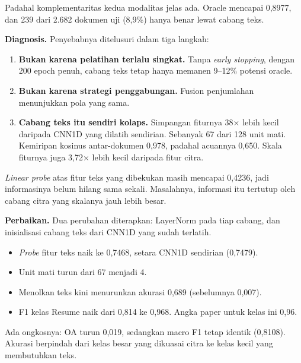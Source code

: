 \documentclass[11pt,a4paper]{article}
\begin{document}
Padahal komplementaritas kedua modalitas jelas ada. Oracle mencapai 0,8977, dan 239
dari 2.682 dokumen uji (8,9\%) hanya benar lewat cabang teks.

\textbf{Diagnosis.} Penyebabnya ditelusuri dalam tiga langkah:
\begin{enumerate}
  \item \textbf{Bukan karena pelatihan terlalu singkat.} Tanpa \textit{early stopping},
  dengan 200 epoch penuh, cabang teks tetap hanya memanen 9--12\% potensi oracle.
  \item \textbf{Bukan karena strategi penggabungan.} Fusion penjumlahan menunjukkan
  pola yang sama.
  \item \textbf{Cabang teks itu sendiri kolaps.} Simpangan fiturnya 38$\times$ lebih kecil
  daripada CNN1D yang dilatih sendirian. Sebanyak 67 dari 128 unit mati. Kemiripan
  kosinus antar-dokumen 0,978, padahal acuannya 0,650. Skala fiturnya juga
  3,72$\times$ lebih kecil daripada fitur citra.
\end{enumerate}
\textit{Linear probe} atas fitur teks yang dibekukan masih mencapai 0,4236, jadi
informasinya belum hilang sama sekali. Masalahnya, informasi itu tertutup oleh cabang
citra yang skalanya jauh lebih besar.

\textbf{Perbaikan.} Dua perubahan diterapkan: LayerNorm pada tiap cabang, dan
inisialisasi cabang teks dari CNN1D yang sudah terlatih.
\begin{itemize}
  \item \textit{Probe} fitur teks naik ke 0,7468, setara CNN1D sendirian (0,7479).
  \item Unit mati turun dari 67 menjadi 4.
  \item Menolkan teks kini menurunkan akurasi 0,689 (sebelumnya 0,007).
  \item F1 kelas Resume naik dari 0,814 ke 0,968. Angka paper untuk kelas ini 0,96.
\end{itemize}
Ada ongkosnya: OA turun 0,019, sedangkan macro F1 tetap identik (0,8108). Akurasi
berpindah dari kelas besar yang dikuasai citra ke kelas kecil yang membutuhkan teks.

\medskip
\noindent{}
\end{document}

